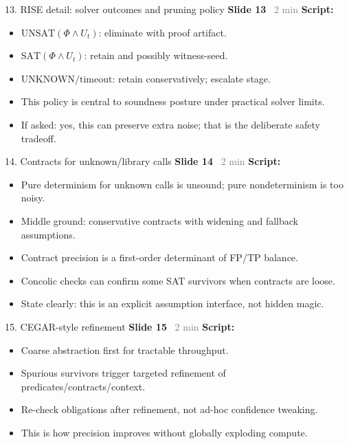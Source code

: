 \documentclass[aspectratio=169]{beamer}
\newcommand{\syncline}[2]{\textbf{#1} \hfill \textcolor{gray}{#2}}
\begin{document}
\begin{frame}{13. RISE detail: solver outcomes and pruning policy}
\syncline{Slide 13}{~2 min}
\textbf{Script:}
\begin{itemize}
  \item \(\text{UNSAT}(\Phi\wedge U_t)\): eliminate with proof artifact.
  \item \(\text{SAT}(\Phi\wedge U_t)\): retain and possibly witness-seed.
  \item \(\text{UNKNOWN}/\text{timeout}\): retain conservatively; escalate stage.
  \item This policy is central to soundness posture under practical solver limits.
  \item If asked: yes, this can preserve extra noise; that is the deliberate safety tradeoff.
\end{itemize}
\end{frame}

\begin{frame}{14. Contracts for unknown/library calls}
\syncline{Slide 14}{~2 min}
\textbf{Script:}
\begin{itemize}
  \item Pure determinism for unknown calls is unsound; pure nondeterminism is too noisy.
  \item Middle ground: conservative contracts with widening and fallback assumptions.
  \item Contract precision is a first-order determinant of FP/TP balance.
  \item Concolic checks can confirm some SAT survivors when contracts are loose.
  \item State clearly: this is an explicit assumption interface, not hidden magic.
\end{itemize}
\end{frame}

\begin{frame}{15. CEGAR-style refinement}
\syncline{Slide 15}{~2 min}
\textbf{Script:}
\begin{itemize}
  \item Coarse abstraction first for tractable throughput.
  \item Spurious survivors trigger targeted refinement of predicates/contracts/context.
  \item Re-check obligations after refinement, not ad-hoc confidence tweaking.
  \item This is how precision improves without globally exploding compute.
\end{itemize}
\end{frame}
\end{document}
